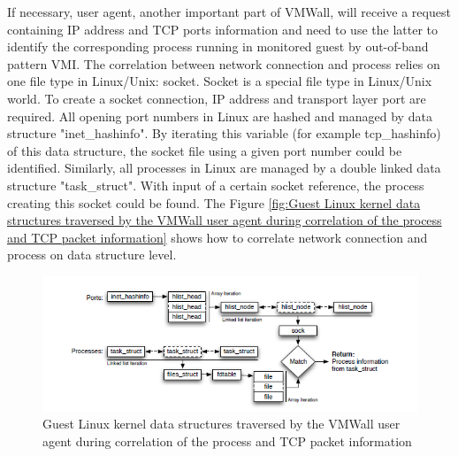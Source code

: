 If necessary, user agent, another important part of VMWall, will receive a request containing IP address and TCP ports
information and need to use the latter to identify the corresponding process running in monitored guest by out-of-band
pattern VMI. The correlation between network connection and process relies on one file type in Linux/Unix: socket.
Socket is a special file type in Linux/Unix world. To create a socket connection, IP address and transport layer port are
required. All opening port numbers in Linux are hashed and managed by data structure "inet\_hashinfo". By iterating this
variable (for example tcp\_hashinfo) of this data structure, the socket file using a given port number could be identified. 
Similarly, all processes in Linux are managed by a double linked data structure "task\_struct". With input of a certain socket
reference, the process creating this socket could be found. The Figure \ref{fig:Guest Linux kernel data structures traversed by
the VMWall user agent during correlation of the process and TCP packet information} shows how to correlate network
connection and process on data structure level.

\begin{figure}[htbp]
	\centering
		\includegraphics[scale = 0.8 ]{Figures/Figure4.png}
	\caption[Out-of-Band pattern VMI applications]
	{Guest Linux kernel data structures traversed by the VMWall user agent during correlation of the
process and TCP packet information \cite{Reference2}}
	\label{fig:Guest Linux kernel data structures traversed by the VMWall user agent during correlation of the
process and TCP packet information}
\end{figure}

